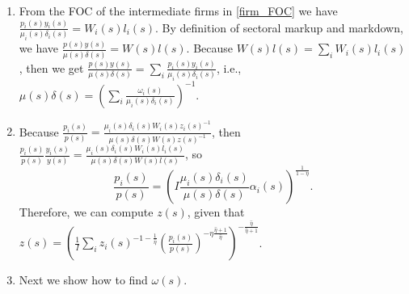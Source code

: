 \documentclass[12pt]{article}%
\begin{document}
\begin{enumerate}
    \item From the FOC of the intermediate firms in \eqref{firm_FOC} we have $\frac{p_i(s) y_i(s)}{\mu_i(s) \delta_i(s)} = W_i(s) l_i(s)$. By definition of sectoral markup and markdown, we have $\frac{p(s) y(s)}{\mu(s) \delta(s)} = W(s) l(s)$. Because $W(s) l(s) = \sum_i W_i(s) l_i(s)$, then we get $\frac{p(s) y(s)}{\mu(s) \delta(s)} = \sum_i \frac{p_i(s) y_i(s)}{\mu_i(s) \delta_i(s)}$, i.e., $\mu(s) \delta(s) = \left( \sum_i \frac{\omega_i(s)}{\mu_i(s) \delta_i(s)} \right) ^{-1}$.

    \item Because $\frac{p_i(s)}{p(s)} = \frac{\mu_i(s) \delta_i(s) W_i(s) z_i(s)^{-1}}{\mu(s) \delta(s) W(s) z(s)^{-1}}$, then $\frac{p_i(s)}{p(s)}\frac{y_i(s)}{y(s)} = \frac{\mu_i(s) \delta_i(s) W_i(s) l_i(s)}{\mu(s) \delta(s) W(s) l(s)}$, so 
    $$\frac{p_i(s)}{p(s)} = \left( I \frac{\mu_i(s) \delta_i(s)}{\mu(s) \delta(s)} \alpha_i(s) \right)^{\frac{1}{1-\eta}}.$$ Therefore, we can compute $z(s)$, given that $z(s) = \left( \frac{1}{I} \sum_i z_i(s)^{-1 -\frac{1}{\hat{\eta}}} \left( \frac{p_i(s)}{p(s)} \right)^{-\eta \frac{\hat{\eta}+1}{\hat{\eta}}} \right)^{-\frac{\hat{\eta}}{\hat{\eta}+1}}$.

    \item  Next we show how to find $\omega(s)$.
    

\end{enumerate}
\end{document}
